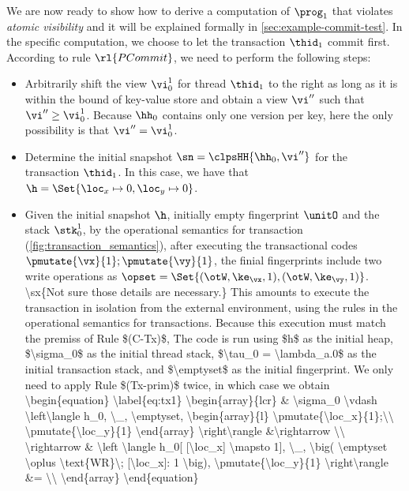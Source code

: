 We are now ready to show how to derive a computation of $\prog_1$ that violates \emph{atomic visibility} and it will be explained formally in \cref{sec:example-commit-test}.
In the specific computation, we choose to let the transaction $\thid_1$ commit first.
According to rule $\rl{PCommit}$, we need to perform the following steps: 
\begin{itemize}
\item
Arbitrarily shift the view $\vi_{0}^{1}$ for thread $\thid_1$ to the right as long as it is within the bound of key-value store and obtain a view \(\vi'' \) such that \( \vi'' \geq \vi_{0}^{1} \). 
Because $\hh_0$ contains only one version per key, here the only possibility is that $\vi'' = \vi_{0}^{1}$.
\item
Determine the initial snapshot $\sn = \clpsHH{\hh_0, \vi''}$ for the transaction $\thid_1$.
In this case, we have that $\h = \Set{\loc_x \mapsto 0, \loc_y \mapsto 0}$.
\item 
Given the initial snapshot \( \h \), initially empty fingerprint \( \unitO \) and the stack \( \stk_{0}^{1}\), by the operational semantics for transaction (\cref{fig:transaction_semantics}), after executing the transactional codes \( \pmutate{\vx}{1}; \pmutate{\vy}{1} \), the finial fingerprints include two write operations as $\opset = \Set{(\otW, \ke_{\vx}, 1), (\otW, \ke_{\vy}, 1)}$.
\ac{
\sx{Not sure those details are necessary.}
This amounts to execute the transaction in isolation from the external environment, using the rules in the operational semantics for 
 transactions. Because this execution must match the premiss of Rule $(C-Tx)$,  The code is run using $h$ as the initial heap, $\sigma_0$ as the initial 
 thread stack, $\tau_0 = \lambda_a.0$ as the initial transaction stack, and $\emptyset$ as the 
 initial fingerprint. We only need to apply 
 Rule $(Tx-prim)$ twice, in which case we obtain
 \begin{equation}
\label{eq:tx1}
\begin{array}{lcr}
& \sigma_0 \vdash \left\langle h_0, \_, \emptyset, \begin{array}{l}
\pmutate{\loc_x}{1};\\ \pmutate{\loc_y}{1} \end{array} \right\rangle 
&\rightarrow \\
\rightarrow & 
\left \langle h_0[ [\loc_x] \mapsto 1], \_, \big( \emptyset \oplus \text{WR}\; [\loc_x]: 1 \big), 
\pmutate{\loc_y}{1} \right\rangle &= \\

\end{array}
\end{equation}}
\end{itemize}
